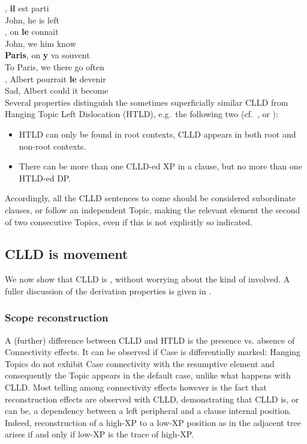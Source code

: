 \documentclass[output=paper]{langsci/langscibook}
\begin{document}
\ea
\ea
	, {\bf il} est parti\\
John, he is left\\
\ex
	, on  {\bf le} connait \\
John, we him know\\
\ex
	 {\bf Paris}, on  {\bf y} va souvent \\
To Paris, we there go often\\
\ex
	, Albert pourrait {\bf le} devenir \label{predle}\\
Sad, Albert could it become \\
\z
\z
%
Several properties distinguish the sometimes superficially similar
\gls{CLLD} from Hanging Topic Left Dislocation
(HTLD), e.g.\ the following two (cf.\ \citealp{AlexiadouLD}, or
\citealp{Krapova2008}):

\begin{itemize}
\item HTLD can only be found in root contexts, \gls{CLLD} appears in both root and non-root contexts.
\item There can be more than one \gls{CLLD}-ed XP in a clause, but no more than one HTLD-ed DP.
\end{itemize}
Accordingly, all the \gls{CLLD} sentences to come
should be considered subordinate clauses, or follow an independent Topic,
making the relevant element the second of two consecutive Topics, even if this
is not explicitly so indicated.

\subsection{CLLD is movement}

We now show that \gls{CLLD} is , without
worrying about the kind of  involved. A fuller discussion of the
derivation properties is given in \cite{Angelopoulo2017}.

\subsubsection{Scope reconstruction}

A (further) difference between \gls{CLLD} and HTLD
is the presence vs. absence of Connectivity effects. It can be observed if Case
is differentially marked: Hanging Topics do not exhibit Case connectivity with
the resumptive element and consequently the Topic appears in the default case,
unlike what happens with CLLD. Most telling among connectivity effects however
is the fact that reconstruction effects are observed with CLLD,  demonstrating
that \gls{CLLD} is, or can be, a 
dependency between a left peripheral  and a clause internal position.
Indeed, reconstruction of a high-XP  to a low-XP position as in the adjacent
tree arises if and only if  low-XP is the trace of  high-XP.
\end{document}
